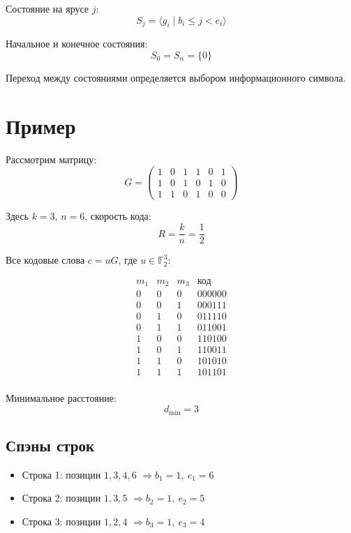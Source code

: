 \documentclass[a4paper,12pt]{article}
\begin{document}
Состояние на ярусе $j$:
\[
S_j = \langle g_i \mid b_i \le j < e_i \rangle
\]

Начальное и конечное состояния:
\[
S_0 = S_n = \{0\}
\]

Переход между состояниями определяется выбором информационного символа.

\section{Пример}

Рассмотрим матрицу:
\[
G =
\begin{pmatrix}
1 & 0 & 1 & 1 & 0 & 1 \\
1 & 0 & 1 & 0 & 1 & 0 \\
1 & 1 & 0 & 1 & 0 & 0
\end{pmatrix}
\]

Здесь $k = 3$, $n = 6$, скорость кода:
\[
R = \frac{k}{n} = \frac{1}{2}
\]

Все кодовые слова $c = uG$, где $u \in \mathbb{F}_2^3$:

\[
\begin{array}{ccc|c}
m_1 & m_2 & m_3 & \text{код} \\
\hline
0 & 0 & 0 & 000000 \\
0 & 0 & 1 & 000111 \\
0 & 1 & 0 & 011110 \\
0 & 1 & 1 & 011001 \\
1 & 0 & 0 & 110100 \\
1 & 0 & 1 & 110011 \\
1 & 1 & 0 & 101010 \\
1 & 1 & 1 & 101101 \\
\end{array}
\]

Минимальное расстояние:
\[
d_{\min} = 3
\]

\subsection{Спэны строк}

\begin{itemize}
    \item Строка 1: позиции $1,3,4,6$ $\Rightarrow b_1 = 1,\ e_1 = 6$
    \item Строка 2: позиции $1,3,5$ $\Rightarrow b_2 = 1,\ e_2 = 5$
    \item Строка 3: позиции $1,2,4$ $\Rightarrow b_3 = 1,\ e_3 = 4$
\end{itemize}
\end{document}
